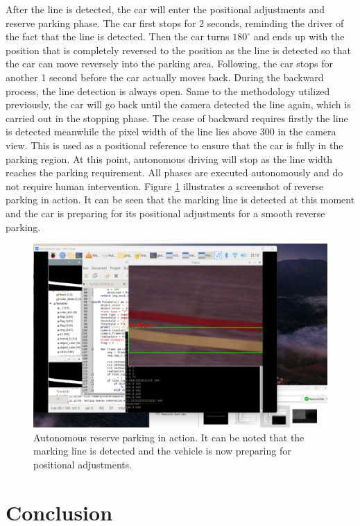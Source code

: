 \documentclass[acmsmall]{acmart}
\begin{document}
After the line is detected, the car will enter the positional adjustments and reserve parking phase. The car first stops for 2 seconds, reminding the driver of the fact that the line is detected. Then the car turns $180^\circ$ and ends up with the position that is completely reversed to the position as the line is detected so that the car can move reversely into the parking area. Following, the car stops for another 1 second before the car actually moves back. During the backward process, the line detection is always open. Same to the methodology utilized previously, the car will go back until the camera detected the line again, which is carried out in the stopping phase. The cease of backward requires firstly the line is detected meanwhile the pixel width of the line lies above 300 in the camera view. This is used as a positional reference to ensure that the car is fully in the parking region. At this point, autonomous driving will stop as the line width reaches the parking requirement. All phases are executed autonomously and do not require human intervention. Figure \ref{fig:ato} illustrates a screenshot of reverse parking in action. It can be seen that the marking line is detected at this moment and the car is preparing for its positional adjustments for a smooth reverse parking.

\begin{figure}[!ht]
    \centering
    \includegraphics[width=13cm]{./action.png}
    \caption{Autonomous reserve parking in action. It can be noted that the marking line is detected and the vehicle is now preparing for positional adjustments.}
    \label{fig:ato}
\end{figure}

\section{Conclusion}
\end{document}
